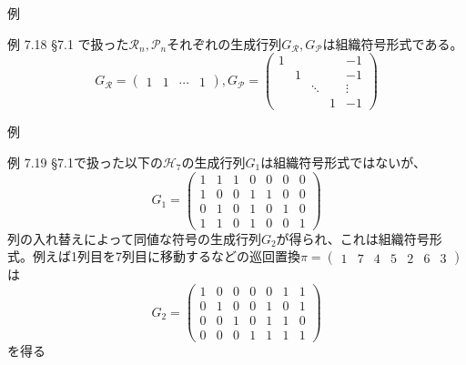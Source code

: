 \documentclass[dvipdfmx,10pt,jsarticle]{beamer}
\begin{document}
  \begin{frame}{例}
    \begin{block}{例 7.18}
      \S7.1 で扱った$\mathcal{R}_n, \mathcal{P}_n$それぞれの生成行列$G_{\mathcal{R}}, G_{\mathcal{P}}$は組織符号形式である。
      \[ G_{\mathcal{R}} = \begin{pmatrix}
          1 & 1 & \cdots & 1
       \end{pmatrix}, G_{\mathcal{P}} = \begin{pmatrix}
          1 &   &   &   & -1 \\
            & 1 &   &   & -1 \\
            &   & \ddots &   & \vdots \\
            &   &   & 1 & -1 
          
        \end{pmatrix} \]
    \end{block}
  \end{frame}

  \begin{frame}{例}
    \begin{block}{例 7.19}
      \S7.1で扱った以下の$\mathcal{H}_7$の生成行列$G_1$は組織符号形式ではないが、
      \[ G_1 = \begin{pmatrix}
          1 & 1 & 1 & 0 & 0 & 0 & 0 \\
          1 & 0 & 0 & 1 & 1 & 0 & 0 \\
          0 & 1 & 0 & 1 & 0 & 1 & 0 \\
          1 & 1 & 0 & 1 & 0 & 0 & 1 
    \end{pmatrix} \]
      列の入れ替えによって同値な符号の生成行列$G_2$が得られ、これは組織符号形式。例えば1列目を7列目に移動するなどの巡回置換{\fontsize{8pt}{0pt}$\pi = \begin{pmatrix} 1 & 7 & 4 & 5 & 2 & 6 & 3 \end{pmatrix}$}は
      \[ G_2 = \begin{pmatrix}
          1 & 0 & 0 & 0 & 0 & 1 & 1 \\
          0 & 1 & 0 & 0 & 1 & 0 & 1 \\
          0 & 0 & 1 & 0 & 1 & 1 & 0 \\
          0 & 0 & 0 & 1 & 1 & 1 & 1
    \end{pmatrix} \]
      を得る
    \end{block}
  \end{frame}
\end{document}
